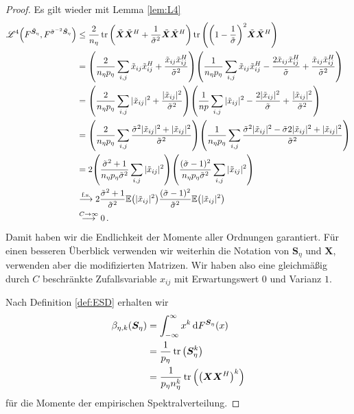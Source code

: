 \documentclass[../Bachelor_LennartKoliwer.tex]{subfiles}
\begin{document}
\begin{proof}
    Es gilt wieder mit Lemma \ref{lem:L4}
    \begin{align*}
        \mathscr{L}^4\lr{F^{\tilde{\bm{S}}_\eta},F^{\tilde{\sigma}^{-2}\tilde{\bm{S}}_\eta}} &\leq \frac{2}{n_\eta}\tr\lr{\tilde{\bm{X}}\tilde{\bm{X}}^H+\frac{1}{\tilde{\sigma}^2}\tilde{\bm{X}}\tilde{\bm{X}}^H}\tr{\lr{\lr{1-\frac{1}{\tilde{\sigma}}}^2 \tilde{\bm{X}}\tilde{\bm{X}}^H}} \\
        &= \lr{\frac{2}{n_\eta p_\eta}\sum_{i,j}\tilde{x}_{ij}\tilde{x}_{ij}^H+\frac{\tilde{x}_{ij}\tilde{x}_{ij}^H}{\tilde{\sigma}^2}}\lr{\frac{1}{n_\eta p_\eta}\sum_{i,j}\tilde{x}_{ij}\tilde{x}_{ij}^H-\frac{2\tilde{x}_{ij}\tilde{x}_{ij}^H}{\tilde{\sigma}}+\frac{\tilde{x}_{ij}\tilde{x}_{ij}^H}{\tilde{\sigma}^2}} \\
        &= \lr{\frac{2}{n_\eta p_\eta}\sum_{i,j}|\tilde{x}_{ij}|^2+\frac{|\tilde{x}_{ij}|^2}{\tilde{\sigma}^2}}\lr{\frac{1}{np}\sum_{i,j}|\tilde{x}_{ij}|^2-\frac{2|\tilde{x}_{ij}|^2}{\tilde{\sigma}}+\frac{|\tilde{x}_{ij}|^2}{\tilde{\sigma}^2}} \\
        &= \lr{\frac{2}{n_\eta p_\eta}\sum_{i,j}\frac{\tilde{\sigma}^2|\tilde{x}_{ij}|^2+|\tilde{x}_{ij}|^2}{\tilde{\sigma}^2}}\lr{\frac{1}{n_\eta p_\eta}\sum_{i,j}\frac{\tilde{\sigma}^2|\tilde{x}_{ij}|^2-\tilde{\sigma}2|\tilde{x}_{ij}|^2+|\tilde{x}_{ij}|^2}{\tilde{\sigma}^2}} \\
        &= 2\lr{\frac{\tilde{\sigma}^2+1}{n_\eta p_\eta\tilde{\sigma}^2}\sum_{i,j}|\tilde{x}_{ij}|^2}\lr{\frac{(\tilde{\sigma}-1)^2}{n_\eta p_\eta\tilde{\sigma}^2}\sum_{i,j}|\tilde{x}_{ij}|^2} \\
        &\overset{\text{f.s.}}{\longrightarrow} 2\frac{\tilde{\sigma}^2+1}{\tilde{\sigma}^2}\mathbb{E}\lr{|\tilde{x}_{ij}|^2}\frac{(\tilde{\sigma}-1)^2}{\tilde{\sigma}^2}\mathbb{E}\lr{|\tilde{x}_{ij}|^2} \\
        &\overset{C\to\infty}{\longrightarrow} 0\,.
    \end{align*}
    Damit haben wir die Endlichkeit der Momente aller Ordnungen garantiert. Für einen besseren Überblick verwenden wir weiterhin die Notation von $\bm{S}_\eta$ und $\bm{X}$, verwenden aber die modifizierten Matrizen. 
    Wir haben also eine gleichmäßig durch $C$ beschränkte Zufallsvariable $x_{ij}$ mit Erwartungswert $0$ und Varianz $1$. 
    
    Nach Definition \ref{def:ESD} erhalten wir 
    \begin{align*}
        \beta_{\eta,k}(\bm{S}_\eta)&= \int_{-\infty}^{\infty}x^k\diff F^{\bm{S}_\eta}(x) \\
                    &= \frac{1}{p_\eta}\tr\lr{\bm{S}_\eta^k} \\
                    &= \frac{1}{p_\eta n_\eta^k}\tr\lr{\lr{\bm{X}\bm{X}^H}^k}    %
    \end{align*}
    für die Momente der empirischen Spektralverteilung. 
    

\end{proof}
\end{document}
